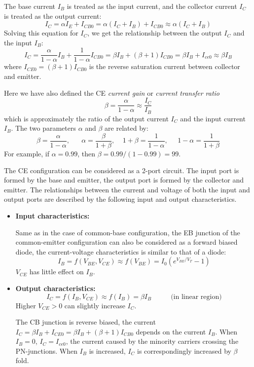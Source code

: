 \begin{itemize}


  The base current $I_B$ is treated as the input current, and the collector
  current $I_C$ is treated as the output current:
  \[
  I_C=\alpha I_E+I_{CB0}=\alpha (I_C+I_B) + I_{CB0}
  \approx \alpha (I_C+I_B) 
  \]
  Solving this equation for $I_C$, we get the relationship between the 
  output $I_C$ and the input $I_B$:
  \[ 
  I_C=\frac{\alpha}{1-\alpha} I_B+\frac{1}{1-\alpha} I_{CB0}
  =\beta I_B +(\beta+1)I_{CB0}=\beta I_B + I_{ce0}
  \approx \beta I_B 
  \]
  where $I_{CE0}=(\beta+1)I_{CB0}$ is the reverse saturation current between 
  collector and emitter. 

  Here we have also defined the CE {\em current gain} or 
  {\em current transfer ratio}
  \[
  \beta=\frac{\alpha}{1-\alpha}\approx\frac{I_C}{I_B}
  \]
  which is approximately the ratio of the output current $I_C$ and the input
  current $I_B$. The two parameters $\alpha$ and $\beta$ are related by:
  \[
  \beta=\frac{\alpha}{1-\alpha},\;\;\;\;\;\;\alpha=\frac{\beta}{1+\beta},
  \;\;\;\;1+\beta=\frac{1}{1-\alpha},\;\;\;\;\;1-\alpha=\frac{1}{1+\beta} 
  \]
  For example, if $\alpha=0.99$, then $\beta=0.99/(1-0.99)=99$. 

  The CE configuration can be considered as a 2-port circuit. The input
  port is formed by the base and emitter, the output port is formed by the 
  collector and emitter. The relationships between the current and voltage
  of both the input and output ports are described by the following input
  and output characteristics.

  \begin{itemize}
  \item {\bf Input characteristics:} 

    Same as in the case of common-base configuration, the EB junction of the
    common-emitter configuration can also be considered as a forward biased
    diode, the current-voltage characteristics is similar to that of a diode:
    \[
    I_B=f(V_{BE},V_{CE})\approx f(V_{BE})=I_0 ( e^{V_{BE}/V_T}-1 )	
    \]
    $V_{CE}$ has little effect on $I_B$.
    
  \item {\bf Output characteristics:} 
    \[
    I_C=f(I_B,V_{CE})\approx f(I_B)=\beta I_B\;\;\;\;\;\;\;\;\;\;\mbox{(in linear region)} 
    \]
    Higher $V_{CE}>0$ can slightly increase $I_C$.

    The CB junction is reverse biased, the current $I_C=\beta I_B+I_{CE0}=
    \beta I_B+(\beta+1)I_{CB0}$ depends on the current $I_B$. When $I_B=0$, 
    $I_C=I_{ce0}$, the current caused by the minority carriers crossing the 
    PN-junctions. When $I_B$ is increased, $I_C$ is correspondingly increased 
    by $\beta$ fold.

    
  \end{itemize}
\end{itemize}

